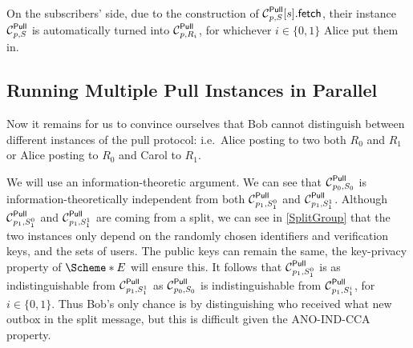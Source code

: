 On the subscribers' side, due to the construction of \(\pget[p, S]{s}\), their 
instance \(\Pull[p, S]\) is automatically turned into \(\Pull[p, R_i]\), for 
whichever \(i\in \{0, 1\}\) Alice put them in.

\subsection{Running Multiple Pull Instances in Parallel}
\label{ParallelPull}

Now it remains for us to convince ourselves that Bob cannot distinguish between
different instances of the pull protocol: i.e.\ Alice posting to two both 
\(R_0\) and \(R_1\) or Alice posting to \(R_0\) and Carol to \(R_1\).

We will use an information-theoretic argument.
We can see that \(\Pull[p_0, S_0]\) is information-theoretically independent 
from both \(\Pull[p_1, S_1^0]\) and \(\Pull[p_1, S_1^1]\).
Although \(\Pull[p_1, S_1^0]\) and \(\Pull[p_1, S_1^1]\) are coming from 
a split, we can see in \cref{SplitGroup} that the two instances only depend 
on the randomly chosen identifiers and verification keys, and the sets of 
users.
The public keys can remain the same, the key-privacy property of \(\E*\) will 
ensure this.
It follows that \(\Pull[p_1, S_1^0]\) is as indistinguishable from \(\Pull[p_1, 
  S_1^1]\) as \(\Pull[p_0, S_0]\) is indistinguishable from \(\Pull[p_1, 
  S_1^i]\), for \(i\in \{0, 1\}\).
Thus Bob's only chance is by distinguishing who received what new outbox in the 
split message, but this is difficult given the ANO-IND-CCA property.

